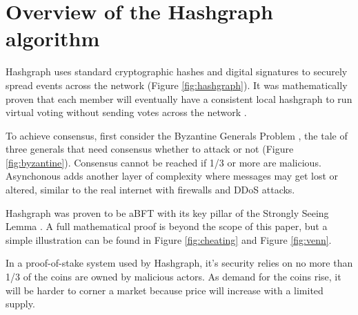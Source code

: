 \section{Overview of the Hashgraph algorithm}



Hashgraph uses standard cryptographic hashes and digital signatures to securely spread events across the network (Figure \ref{fig:hashgraph}). It was mathematically proven that each member will eventually have a consistent local hashgraph to run virtual voting without sending votes across the network \cite{baird2016}.


To achieve consensus, first consider the Byzantine Generals Problem \cite{shostak1982byzantine}, the tale of three generals that need consensus whether to attack or not (Figure \ref{fig:byzantine}). Consensus cannot be reached if 1/3 or more are malicious. Asynchonous adds another layer of complexity where messages may get lost or altered, similar to the real internet with firewalls and DDoS attacks.



Hashgraph was proven to be aBFT with its key pillar of the Strongly Seeing Lemma \cite{baird2016}. A full mathematical proof is beyond the scope of this paper, but a simple illustration can be found in Figure \ref{fig:cheating} and Figure \ref{fig:venn}.



In a proof-of-stake system used by Hashgraph, it's security relies on no more than 1/3 of the coins are owned by malicious actors. As demand for the coins rise, it will be harder to corner a market because price will increase with a limited supply.

